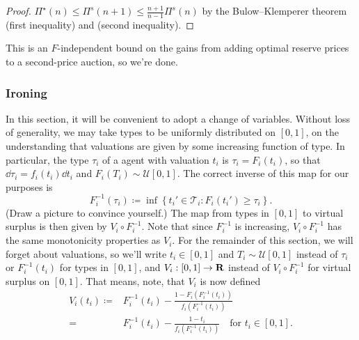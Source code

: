 \documentclass[11pt,letterpaper,reqno,oneside]{article}
\begin{document}
\begin{proof}
	$\Pi^\star(n) \leq \Pi^s(n+1) \leq \frac{n+1}{n-1} \Pi^s(n)$ by the Bulow--Klemperer theorem (first inequality) and  (second inequality).
\end{proof}


\noindent This is an $F$-independent bound on the gains from adding optimal reserve prices to a second-price auction, so we're done.



\subsubsection{Ironing}
\label{sec:mech_desi:several_agents_one_dimension:ironing}

In this section, it will be convenient to adopt a change of variables. Without loss of generality, we may take types to be uniformly distributed on $[0,1]$, on the understanding that valuations are given by some increasing function of type. In particular, the type $\tau_i$ of a agent with valuation $t_i$ is $\tau_i = F_i(t_i)$, so that $\dd \tau_i = f_i(t_i) \dd t_i$ and $F_i(T_i) \sim \mathcal{U}[0,1]$. The correct inverse of this map for our purposes is
%
\begin{equation*}
	F_i^{-1}(\tau_i)
	\coloneqq \inf\left\{ 
	t_i' \in \mathcal{T}_i : F_i(t_i') \geq \tau_i
	\right\} .
\end{equation*}
%
(Draw a picture to convince yourself.) The map from types in $[0,1]$ to virtual surplus is then given by $V_i \circ F_i^{-1}$. Note that since $F_i^{-1}$ is increasing, $V_i \circ F_i^{-1}$ has the same monotonicity properties as $V_i$. For the remainder of this section, we will forget about valuations, so we'll write $t_i \in [0,1]$ and $T_i \sim \mathcal{U}[0,1]$ instead of $\tau_i$ or $F_i^{-1}(t_i)$ for types in $[0,1]$, and $V_i : [0,1] \to \mathbf{R}$ instead of $V_i \circ F_i^{-1}$ for virtual surplus on $[0,1]$. That means, note, that $V_i$ is now defined
%
\begin{align*}
	V_i(t_i)
	\coloneqq{}& F_i^{-1}(t_i) 
	- \frac{ 1 - F_i\left( F_i^{-1}(t_i) \right) }
	{ f_i\left( F_i^{-1}(t_i) \right) }
	\\
	={}& F_i^{-1}(t_i) 
	- \frac{ 1 - t_i }
	{ f_i\left( F_i^{-1}(t_i) \right) }
	\quad\text{for $t_i \in [0,1]$}.
\end{align*}
\end{document}
